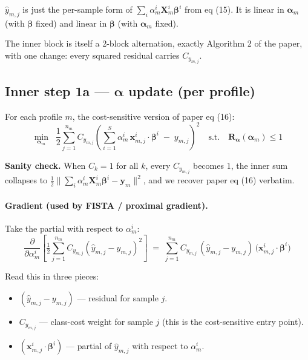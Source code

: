 \documentclass[11pt,a4paper]{article}
\begin{document}
$\hat{y}_{m,j}$ is just the per-sample form of $\sum_i \alpha^i_m \mathbf{X}^i_m \boldsymbol{\beta}^i$ from eq (15). It is linear in $\boldsymbol{\alpha}_m$ (with $\boldsymbol{\beta}$ fixed) and linear in $\boldsymbol{\beta}$ (with $\boldsymbol{\alpha}_m$ fixed).

The inner block is itself a 2-block alternation, exactly Algorithm 2 of the paper, with one change: every squared residual carries $C_{y_{m,j}}$.

\subsection{Inner step 1a --- $\boldsymbol{\alpha}$ update (per profile)}

For each profile $m$, the cost-sensitive version of paper eq (16):
\begin{equation}
\boxed{\;\min_{\boldsymbol{\alpha}_m}\;\;\frac{1}{2}\sum_{j=1}^{n_m} C_{y_{m,j}}\!\left(\sum_{i=1}^{S}\alpha^{i}_{m}\,\mathbf{x}^{i}_{m,j}\!\cdot\boldsymbol{\beta}^{i} \;-\; y_{m,j}\right)^{\!2}\quad\text{s.t.}\quad \mathbf{R}_{\boldsymbol{\alpha}}(\boldsymbol{\alpha}_m) \leq 1\;}
\end{equation}

\textbf{Sanity check.} When $C_k = 1$ for all $k$, every $C_{y_{m,j}}$ becomes $1$, the inner sum collapses to $\frac{1}{2}\|\sum_i \alpha^i_m \mathbf{X}^i_m \boldsymbol{\beta}^i - \mathbf{y}_m\|^2$, and we recover paper eq (16) verbatim. \checkmark

\paragraph{Gradient (used by FISTA / proximal gradient).} Take the partial with respect to $\alpha^i_m$:
\[
\frac{\partial}{\partial \alpha^{i}_{m}}\!\left[\tfrac{1}{2}\sum_{j=1}^{n_m} C_{y_{m,j}}(\hat{y}_{m,j} - y_{m,j})^{2}\right] \;=\; \sum_{j=1}^{n_m} C_{y_{m,j}}\,(\hat{y}_{m,j} - y_{m,j})\,\big(\mathbf{x}^{i}_{m,j}\!\cdot\boldsymbol{\beta}^{i}\big)
\]

Read this in three pieces:
\begin{itemize}[leftmargin=*,itemsep=2pt]
  \item $(\hat{y}_{m,j} - y_{m,j})$ --- residual for sample $j$.
  \item $C_{y_{m,j}}$ --- class-cost weight for sample $j$ (this is the cost-sensitive entry point).
  \item $(\mathbf{x}^i_{m,j} \cdot \boldsymbol{\beta}^i)$ --- partial of $\hat{y}_{m,j}$ with respect to $\alpha^i_m$.
\end{itemize}
\end{document}
